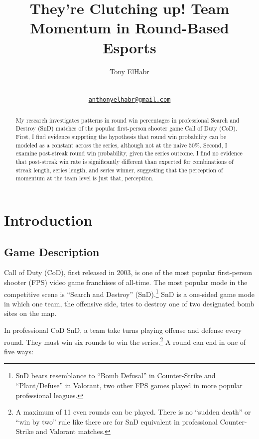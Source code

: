 \documentclass{article}
\title{They're Clutching up! Team Momentum in Round-Based Esports}
\author{
    Tony ElHabr
   \\
     \\
   \\
  \texttt{\href{mailto:anthonyelhabr@gmail.com}{\nolinkurl{anthonyelhabr@gmail.com}}} \\
  }
\begin{document}
\maketitle


\begin{abstract}
My research investigates patterns in round win percentages in
professional Search and Destroy (SnD) matches of the popular
first-person shooter game Call of Duty (CoD). First, I find evidence
supprting the hypothesis that round win probability can be modeled as a
constant across the series, although not at the naive 50\%. Second, I
examine post-streak round win probability, given the series outcome. I
find no evidence that post-streak win rate is significantly different
than expected for combinations of streak length, series length, and
series winner, suggesting that the perception of momentum at the team
level is just that, perception.
\end{abstract}


\hypertarget{introduction}{%
\section{Introduction}\label{introduction}}

\hypertarget{game-description}{%
\subsection{Game Description}\label{game-description}}

Call of Duty (CoD), first released in 2003, is one of the most popular
first-person shooter (FPS) video game franchises of all-time. The most
popular mode in the competitive scene is ``Search and Destroy''
(SnD).\footnote{SnD bears resemblance to ``Bomb Defusal'' in
  Counter-Strike and ``Plant/Defuse'' in Valorant, two other FPS games
  played in more popular professional leagues.} SnD is a one-sided game
mode in which one team, the offensive side, tries to destroy one of two
designated bomb sites on the map.

In professional CoD SnD, a team take turns playing offense and defense
every round. They must win six rounds to win the series.\footnote{A
  maximum of 11 even rounds can be played. There is no ``sudden death''
  or ``win by two'' rule like there are for SnD equivalent in
  professional Counter-Strike and Valorant matches.} A round can end in
one of five ways:
\end{document}
